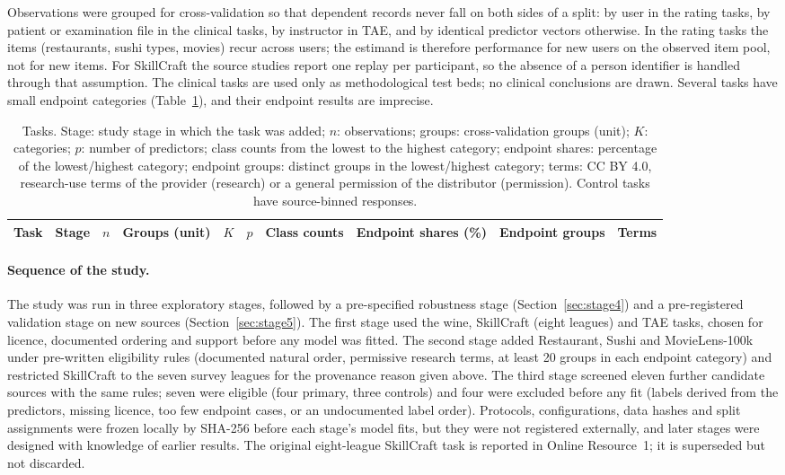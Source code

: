 \documentclass[pdflatex,sn-mathphys-ay]{sn-jnl}
\theoremstyle{thmstyleone}
\theoremstyle{thmstylethree}
\begin{document}
Observations were grouped for cross-validation so that dependent records never fall on both sides of a split: by user in the rating tasks, by patient or examination file in the clinical tasks, by instructor in TAE, and by identical predictor vectors otherwise. In the rating tasks the items (restaurants, sushi types, movies) recur across users; the estimand is therefore performance for new users on the observed item pool, not for new items. For SkillCraft the source studies report one replay per participant, so the absence of a person identifier is handled through that assumption. The clinical tasks are used only as methodological test beds; no clinical conclusions are drawn. Several tasks have small endpoint categories (Table~\ref{tab:data}), and their endpoint results are imprecise.

\begin{table}[t]
\caption{Tasks. Stage: study stage in which the task was added; $n$: observations; groups: cross-validation groups (unit); $K$: categories; $p$: number of predictors; class counts from the lowest to the highest category; endpoint shares: percentage of the lowest/highest category; endpoint groups: distinct groups in the lowest/highest category; terms: CC BY 4.0, research-use terms of the provider (research) or a general permission of the distributor (permission). Control tasks have source-binned responses.}\label{tab:data}
\centering\scriptsize
\setlength{\tabcolsep}{3pt}
\begin{tabular}{@{}lcrlrrlccl@{}}
\toprule
Task & Stage & $n$ & Groups (unit) & $K$ & $p$ & Class counts & Endpoint shares (\%) & Endpoint groups & Terms\\
\midrule

\bottomrule
\end{tabular}
\end{table}

\paragraph{Sequence of the study.} The study was run in three exploratory stages, followed by a pre-specified robustness stage (Section~\ref{sec:stage4}) and a pre-registered validation stage on new sources (Section~\ref{sec:stage5}). The first stage used the wine, SkillCraft (eight leagues) and TAE tasks, chosen for licence, documented ordering and support before any model was fitted. The second stage added Restaurant, Sushi and MovieLens-100k under pre-written eligibility rules (documented natural order, permissive research terms, at least 20 groups in each endpoint category) and restricted SkillCraft to the seven survey leagues for the provenance reason given above. The third stage screened eleven further candidate sources with the same rules; seven were eligible (four primary, three controls) and four were excluded before any fit (labels derived from the predictors, missing licence, too few endpoint cases, or an undocumented label order). Protocols, configurations, data hashes and split assignments were frozen locally by SHA-256 before each stage's model fits, but they were not registered externally, and later stages were designed with knowledge of earlier results. The original eight-league SkillCraft task is reported in Online Resource~1; it is superseded but not discarded.
\end{document}
